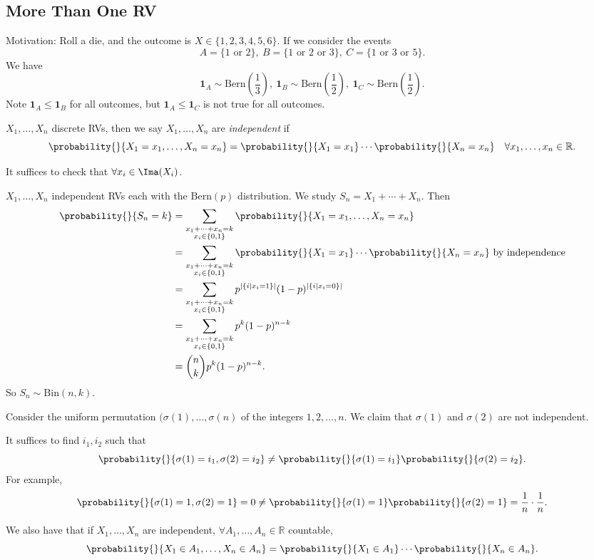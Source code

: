 \subsection{More Than One RV}
Motivation: Roll a die, and the outcome is \(X \in \{1,2,3,4,5,6\}\). If we consider the events
\[
    A = \{1 \text{ or } 2\},~B = \{1 \text{ or } 2 \text{ or } 3\},~C = \{1 \text{ or } 3 \text{ or } 5\}.
\]
We have
\[
    \textbf{1}_A \sim \mathrm{Bern}(\frac{1}{3}),~\textbf{1}_B \sim \mathrm{Bern}(\frac{1}{2}),~\textbf{1}_C \sim \mathrm{Bern}(\frac{1}{2}) .
\]
Note \(\textbf{1}_A \leq \textbf{1}_B\) for all outcomes, but \(\textbf{1}_A \leq \textbf{1}_C\) is not true for all outcomes.
\begin{definition}
    \(X_1, \ldots, X_n\) discrete RVs, then we say \(X_1, \ldots, X_n\) are \textit{independent} if
    \[
        \probability{}{X_1 = x_1, \ldots, X_n = x_n} = \probability{}{X_1 = x_1} \cdots \probability{}{X_n = x_n}\quad \forall x_1, \ldots, x_n \in \mathbb{R}.
    \]
\end{definition}
\begin{remark}
    It suffices to check that \(\forall x_i \in \Ima(X_i)\).
\end{remark}
\begin{example}
    \(X_1, \ldots, X_n\) independent RVs each with the \(\mathrm{Bern}(p)\) distribution. We study \(S_n = X_1 + \cdots + X_n\). Then
    \begin{align*}
        \probability{}{S_n = k} &= \sum_{\substack{x_1 + \cdots + x_n = k\\x_i \in \{0,1\}}} \probability{}{X_1 = x_1, \ldots, X_n = x_n}\\
        &= \sum_{\substack{x_1 + \cdots + x_n = k\\x_i \in \{0,1\}}} \probability{}{X_1 = x_1}\cdots\probability{}{X_n = x_n} \text{ by independence}\\
        &= \sum_{\substack{x_1 + \cdots + x_n = k\\x_i \in \{0,1\}}}p^{\left\vert \{i\mid x_i = 1\} \right\vert}(1-p)^{\left\vert \{i\mid x_i = 0\} \right\vert}\\
        &= \sum_{\substack{x_1 + \cdots + x_n = k\\x_i \in \{0,1\}}}p^k(1-p)^{n-k}\\
        &= \binom{n}{k}p^k (1-p)^{n-k}.
    \end{align*}
    So \(S_n \sim \mathrm{Bin}(n, k)\).
\end{example}
\begin{example}
    Consider the uniform permutation \((\sigma(1), \ldots, \sigma(n)\) of the integers \(1, 2, \ldots, n\). We claim that \(\sigma(1)\) and \(\sigma(2)\) are not independent.

    It suffices to find \(i_1, i_2\) such that
    \[
        \probability{}{\sigma(1) = i_1, \sigma(2) = i_2} \neq \probability{}{\sigma(1)=i_1}\probability{}{\sigma(2) = i_2}.
    \]
    For example,
    \[
        \probability{}{\sigma(1) = 1, \sigma(2) = 1} = 0 \neq \probability{}{\sigma(1)=1}\probability{}{\sigma(2) = 1} = \frac{1}{n}\cdot \frac{1}{n}.
    \]
\end{example}
We also have that if \(X_1, \ldots, X_n\) are independent, \(\forall A_1, \ldots, A_n \in \mathbb{R}\) countable,
\[
    \probability{}{X_1 \in A_1, \ldots, X_n \in A_n} = \probability{}{X_1 \in A_1} \cdots \probability{}{X_n \in A_n}.
\]